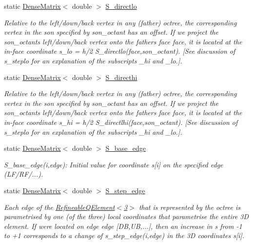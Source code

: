 \begin{DoxyCompactItemize}
static \hyperlink{classoomph_1_1DenseMatrix}{Dense\+Matrix}$<$ double $>$ \hyperlink{classoomph_1_1OcTree_a2ece71f32cf50ba50851d2102af15426}{S\+\_\+directlo}
\begin{DoxyCompactList}\small\item\em Relative to the left/down/back vertex in any (father) octree, the corresponding vertex in the son specified by {\ttfamily son\+\_\+octant} has an offset. If we project the son\+\_\+octant\textquotesingle{}s left/down/back vertex onto the father\textquotesingle{}s face {\ttfamily face}, it is located at the in-\/face coordinate {\ttfamily s\+\_\+lo} = h/2 {\ttfamily S\+\_\+directlo(face,son\+\_\+octant)}. \mbox{[}See discussion of {\ttfamily s\+\_\+steplo} for an explanation of the subscripts {\ttfamily \+\_\+hi} and {\ttfamily \+\_\+lo}.\mbox{]}. \end{DoxyCompactList}\item 
static \hyperlink{classoomph_1_1DenseMatrix}{Dense\+Matrix}$<$ double $>$ \hyperlink{classoomph_1_1OcTree_a11aca558846c26e31f802396508bea51}{S\+\_\+directhi}
\begin{DoxyCompactList}\small\item\em Relative to the left/down/back vertex in any (father) octree, the corresponding vertex in the son specified by {\ttfamily son\+\_\+octant} has an offset. If we project the son\+\_\+octant\textquotesingle{}s left/down/back vertex onto the father\textquotesingle{}s face {\ttfamily face}, it is located at the in-\/face coordinate {\ttfamily s\+\_\+hi} = h/2 {\ttfamily S\+\_\+directlhi(face,son\+\_\+octant)}. \mbox{[}See discussion of {\ttfamily s\+\_\+steplo} for an explanation of the subscripts {\ttfamily \+\_\+hi} and {\ttfamily \+\_\+lo}.\mbox{]}. \end{DoxyCompactList}\item 
static \hyperlink{classoomph_1_1DenseMatrix}{Dense\+Matrix}$<$ double $>$ \hyperlink{classoomph_1_1OcTree_a9f8afa940d0ce2ceca2a064f3f1ec6b1}{S\+\_\+base\+\_\+edge}
\begin{DoxyCompactList}\small\item\em S\+\_\+base\+\_\+edge(i,edge)\+: Initial value for coordinate s\mbox{[}i\mbox{]} on the specified edge (L\+F/\+R\+F/...). \end{DoxyCompactList}\item 
static \hyperlink{classoomph_1_1DenseMatrix}{Dense\+Matrix}$<$ double $>$ \hyperlink{classoomph_1_1OcTree_a036d7e355507212bee6a53d42adbea26}{S\+\_\+step\+\_\+edge}
\begin{DoxyCompactList}\small\item\em Each edge of the \hyperlink{classoomph_1_1RefineableQElement_3_013_01_4}{Refineable\+Q\+Element$<$3$>$} that is represented by the octree is parametrised by one (of the three) local coordinates that parametrise the entire 3D element. If we\textquotesingle{}re located on edge {\ttfamily edge} \mbox{[}DB,UB,...\mbox{]}, then an increase in s from -\/1 to +1 corresponds to a change of {\ttfamily s\+\_\+step\+\_\+edge(i,edge)} in the 3D coordinates {\ttfamily s}\mbox{[}i\mbox{]}. \end{DoxyCompactList}\item 

\end{DoxyCompactItemize}
